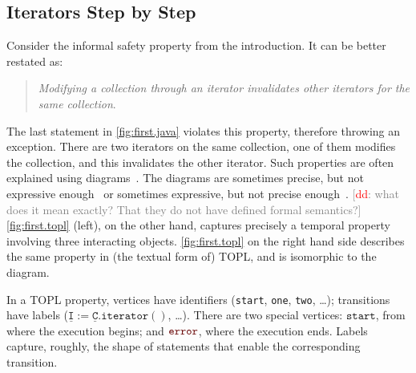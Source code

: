 \documentclass[10pt]{llncs} %
\newcommand{\noterg}[2]{\textcolor{gray}{[\textcolor{red}{#1}: #2]}}
\newcommand{\dd}[1]{\noterg{dd}{#1}}
\newcommand{\dinocomment}[1]{\dd{#1}}
\newcommand{\error}{\ensuremath{\textcolor{darkred}{\mathtt{error}}}\xspace}
\newcommand{\pattern}[1]{\ensuremath{\mathtt{\underline{#1}}}}
\newcommand{\start}{\ensuremath{\mathtt{start}}\xspace}
\begin{document}
\subsection{Iterators Step by Step} \label{sec:examples.steps} %
Consider the informal safety property from the introduction. It can be better restated as:
\begin{quote}
\emph{Modifying a collection through an iterator invalidates other iterators for the same collection}.
\end{quote}
\noindent
The last statement in \autoref{fig:first.java} violates this property, therefore throwing an exception.
There are two iterators on the same collection, one of them modifies the collection, and this invalidates the other iterator.
Such properties are often explained using diagrams~\cite{dblp:journals/scp/FieldGRY05,dblp:conf/issta/FinkYDRG06,dblp:conf/oopsla/bierhoffa07,dblp:conf/oopsla/naeeml08,dblp:conf/sigsoft/boddenlh08,dblp:conf/ecoop/bierhoffba09}.
The diagrams are sometimes precise, but not expressive enough~\cite{dblp:journals/scp/FieldGRY05,dblp:conf/issta/FinkYDRG06} or sometimes expressive, but not precise enough~\cite{dblp:conf/oopsla/bierhoffa07,dblp:conf/oopsla/naeeml08,dblp:conf/sigsoft/boddenlh08,dblp:conf/ecoop/bierhoffba09}.
\dinocomment{what does it mean exactly? That they do not have defined formal semantics?}
\autoref{fig:first.topl} (left), on the other hand, captures precisely a temporal property involving three interacting objects.
\autoref{fig:first.topl} on the right hand side describes the same property in (the textual form of) TOPL, and is  isomorphic to the diagram.

In a TOPL property, vertices have identifiers (\texttt{start}, \texttt{one}, \texttt{two}, \dots);
transitions have labels ($\pattern I:=\pattern C.\mathtt{iterator}()$, \dots).
There are two special vertices: \start, from where the execution begins; and \error, where the execution ends.
Labels capture, roughly, the shape of statements that enable the corresponding transition.
\end{document}
